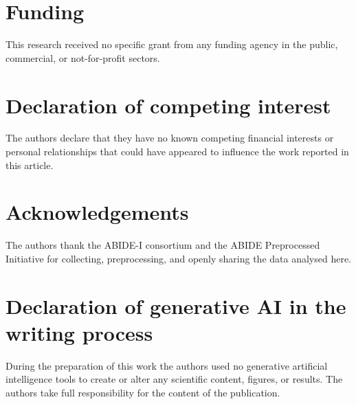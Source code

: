 \documentclass[a4paper,fleqn]{cas-sc}
\begin{document}
\section*{Funding}
This research received no specific grant from any funding agency in the public, commercial, or
not-for-profit sectors.

\section*{Declaration of competing interest}
The authors declare that they have no known competing financial interests or personal
relationships that could have appeared to influence the work reported in this article.

\section*{Acknowledgements}
The authors thank the ABIDE-I consortium and the ABIDE Preprocessed Initiative for collecting,
preprocessing, and openly sharing the data analysed here.

\section*{Declaration of generative AI in the writing process}
During the preparation of this work the authors used no generative artificial intelligence
tools to create or alter any scientific content, figures, or results. The authors take full
responsibility for the content of the publication.



\end{document}
